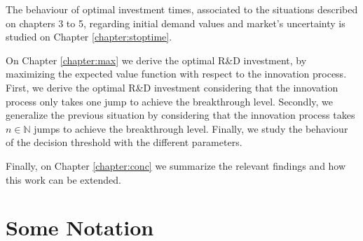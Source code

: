 The behaviour of optimal investment times, associated to the situations described on chapters 3 to 5, regarding initial demand values and market's uncertainty is studied on Chapter \ref{chapter:stoptime}.



On Chapter \ref{chapter:max} we derive the optimal R\&D investment, by maximizing the expected value function with respect to the innovation process. 
First, we derive the optimal R\&D investment considering that the innovation process only takes one jump to achieve the breakthrough level.
Secondly, we generalize the previous situation by considering that the innovation process takes $n \in \mathds{N}$ jumps to achieve the breakthrough level.
Finally, we study the behaviour of the decision threshold with the different parameters.



Finally, on Chapter \ref{chapter:conc} we summarize the relevant findings and how this work can be extended.




\section{Some Notation}
\label{intro:notation}

